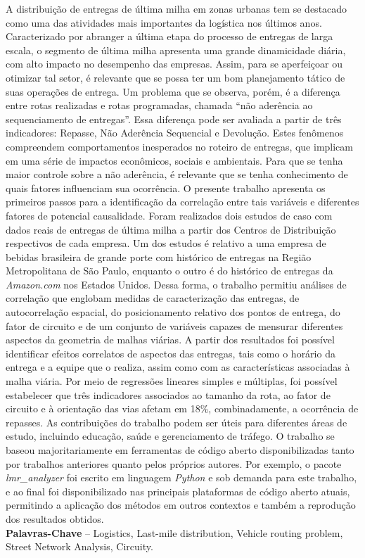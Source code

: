 \begin{resumo}

A distribuição de entregas de última milha em zonas urbanas tem se destacado como uma das atividades mais importantes da logística nos últimos anos.
Caracterizado por abranger a última etapa do processo de entregas de larga escala, o segmento de última milha apresenta uma grande dinamicidade diária, com alto impacto no desempenho das empresas.
Assim, para se aperfeiçoar ou otimizar tal setor, é relevante que se possa ter um bom planejamento tático de suas operações de entrega.
Um problema que se observa, porém, é a diferença entre rotas realizadas e rotas programadas, chamada ``não aderência ao sequenciamento de entregas''.
Essa diferença pode ser avaliada a partir de três indicadores: Repasse, Não Aderência Sequencial e Devolução.
Estes fenômenos compreendem comportamentos inesperados no roteiro de entregas, que implicam em uma série de impactos econômicos, sociais e ambientais.
%
Para que se tenha maior controle sobre a não aderência, é relevante que se tenha conhecimento de quais fatores influenciam sua ocorrência.
O presente trabalho apresenta os primeiros passos para a identificação da correlação entre tais variáveis e diferentes fatores de potencial causalidade.
%
Foram realizados dois estudos de caso com dados reais de entregas de última milha a partir dos Centros de Distribuição respectivos de cada empresa.
Um dos estudos é relativo a uma empresa de bebidas brasileira de grande porte com histórico de entregas na Região Metropolitana de São Paulo, enquanto o outro é do histórico de entregas da \textit{Amazon.com} nos Estados Unidos.
%
Dessa forma, o trabalho permitiu análises de correlação que englobam medidas de caracterização das entregas, de autocorrelação espacial, do posicionamento relativo dos pontos de entrega, do fator de circuito e de um conjunto de variáveis capazes de mensurar diferentes aspectos da geometria de malhas viárias.
% 
A partir dos resultados foi possível identificar efeitos correlatos de aspectos das entregas, tais como o horário da entrega e a equipe que o realiza, assim como com as características associadas à malha viária.
Por meio de regressões lineares simples e múltiplas, foi possível estabelecer que três indicadores associados ao tamanho da rota, ao fator de circuito e à orientação das vias afetam em 18\%, combinadamente, a ocorrência de repasses.
As contribuições do trabalho podem ser úteis para diferentes áreas de estudo, incluindo educação, saúde e gerenciamento de tráfego.
O trabalho se baseou majoritariamente em ferramentas de código aberto disponibilizadas tanto por trabalhos anteriores quanto pelos próprios autores.
Por exemplo, o pacote \textit{lmr\_analyzer} foi escrito em linguagem \textit{Python} e sob demanda para este trabalho, e ao final foi disponibilizado nas principais plataformas de código aberto atuais, permitindo a aplicação dos métodos em outros contextos e também a reprodução dos resultados obtidos.  
\\[3\baselineskip]
%
\textbf{Palavras-Chave} -- Logistics, Last-mile distribution, Vehicle routing problem, Street Network Analysis, Circuity.
\end{resumo}


